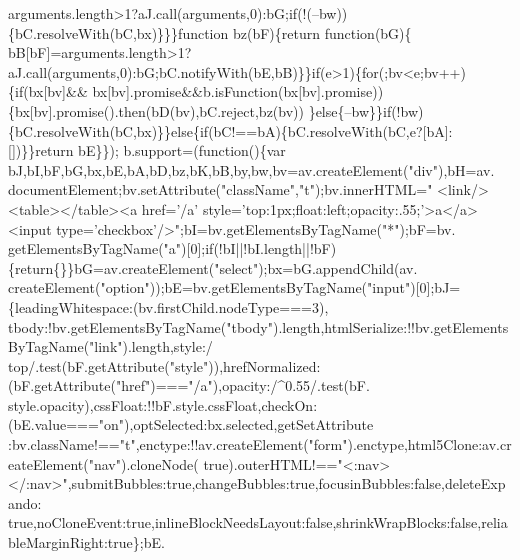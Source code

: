 \begin{DoxyCode}
      arguments.length>1?aJ.call(arguments,0):bG;\textcolor{keywordflow}{if}(!(--bw))\{bC.resolveWith(bC,bx)\}\}\}\textcolor{keyword}{function} bz(bF)\{\textcolor{keywordflow}{return} \textcolor{keyword}{function}(bG)\{
      bB[bF]=arguments.length>1?aJ.call(arguments,0):bG;bC.notifyWith(bE,bB)\}\}\textcolor{keywordflow}{if}(e>1)\{\textcolor{keywordflow}{for}(;bv<e;bv++)\{\textcolor{keywordflow}{if}(bx[bv]&&
      bx[bv].promise&&b.isFunction(bx[bv].promise))\{bx[bv].promise().then(bD(bv),bC.reject,bz(bv))
\}\textcolor{keywordflow}{else}\{--bw\}\}\textcolor{keywordflow}{if}(!bw)\{bC.resolveWith(bC,bx)\}\}\textcolor{keywordflow}{else}\{\textcolor{keywordflow}{if}(bC!==bA)\{bC.resolveWith(bC,e?[bA]:[])\}\}\textcolor{keywordflow}{return} bE\}\});
      b.support=(\textcolor{keyword}{function}()\{var bJ,bI,bF,bG,bx,bE,bA,bD,bz,bK,bB,by,bw,bv=av.createElement(\textcolor{stringliteral}{"div"}),bH=av.
      documentElement;bv.setAttribute(\textcolor{stringliteral}{"className"},\textcolor{stringliteral}{"t"});bv.innerHTML=\textcolor{stringliteral}{"   <link/><table></table><a href='/a'
       style='top:1px;float:left;opacity:.55;'>a</a><input type='checkbox'/>"};bI=bv.getElementsByTagName(\textcolor{stringliteral}{"*"});bF=bv.
      getElementsByTagName(\textcolor{stringliteral}{"a"})[0];\textcolor{keywordflow}{if}(!bI||!bI.length||!bF)\{\textcolor{keywordflow}{return}\{\}\}bG=av.createElement(\textcolor{stringliteral}{"select"});bx=bG.appendChild(av.
      createElement(\textcolor{stringliteral}{"option"}));bE=bv.getElementsByTagName(\textcolor{stringliteral}{"input"})[0];bJ=\{leadingWhitespace:(bv.firstChild.nodeType===3),
      tbody:!bv.getElementsByTagName(\textcolor{stringliteral}{"tbody"}).length,htmlSerialize:!!bv.getElementsByTagName(\textcolor{stringliteral}{"link"}).length,style:/
      top/.test(bF.getAttribute(\textcolor{stringliteral}{"style"})),hrefNormalized:(bF.getAttribute(\textcolor{stringliteral}{"href"})===\textcolor{stringliteral}{"/a"}),opacity:/^0.55/.test(bF.
      style.opacity),cssFloat:!!bF.style.cssFloat,checkOn:(bE.value===\textcolor{stringliteral}{"on"}),optSelected:bx.selected,getSetAttribute
      :bv.className!==\textcolor{stringliteral}{"t"},enctype:!!av.createElement(\textcolor{stringliteral}{"form"}).enctype,html5Clone:av.createElement(\textcolor{stringliteral}{"nav"}).cloneNode(\textcolor{keyword}{
      true}).outerHTML!==\textcolor{stringliteral}{"<:nav></:nav>"},submitBubbles:\textcolor{keyword}{true},changeBubbles:\textcolor{keyword}{true},focusinBubbles:\textcolor{keyword}{false},deleteExpando:\textcolor{keyword}{
      true},noCloneEvent:\textcolor{keyword}{true},inlineBlockNeedsLayout:\textcolor{keyword}{false},shrinkWrapBlocks:\textcolor{keyword}{false},reliableMarginRight:\textcolor{keyword}{true}\};bE.

\end{DoxyCode}
